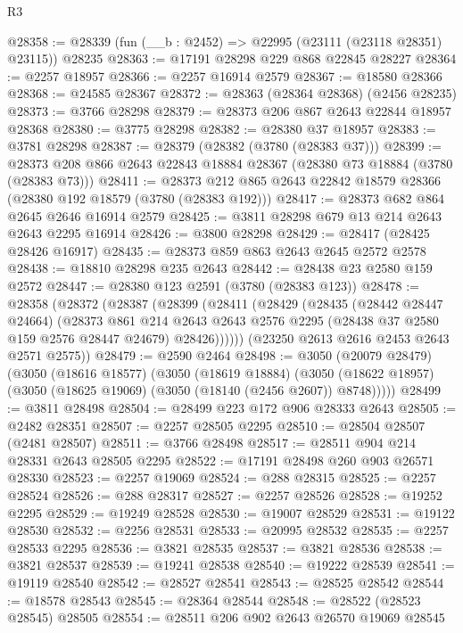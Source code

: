 \begin{lexlean}{R3}
\begin{coremodule}
@28358 := @28339 (fun (__b : @2452) => @22995 (@23111 (@23118 @28351) @23115)) @28235
@28363 := @17191 @28298 @229 @868 @22845 @28227
@28364 := @2257 @18957
@28366 := @2257 @16914 @2579
@28367 := @18580 @28366
@28368 := @24585 @28367
@28372 := @28363 (@28364 @28368) (@2456 @28235)
@28373 := @3766 @28298
@28379 := @28373 @206 @867 @2643 @22844 @18957 @28368
@28380 := @3775 @28298
@28382 := @28380 @37 @18957
@28383 := @3781 @28298
@28387 := @28379 (@28382 (@3780 (@28383 @37)))
@28399 := @28373 @208 @866 @2643 @22843 @18884 @28367 (@28380 @73 @18884 (@3780 (@28383 @73)))
@28411 := @28373 @212 @865 @2643 @22842 @18579 @28366 (@28380 @192 @18579 (@3780 (@28383 @192)))
@28417 := @28373 @682 @864 @2645 @2646 @16914 @2579
@28425 := @3811 @28298 @679 @13 @214 @2643 @2643 @2295 @16914
@28426 := @3800 @28298
@28429 := @28417 (@28425 @28426 @16917)
@28435 := @28373 @859 @863 @2643 @2645 @2572 @2578
@28438 := @18810 @28298 @235 @2643
@28442 := @28438 @23 @2580 @159 @2572
@28447 := @28380 @123 @2591 (@3780 (@28383 @123))
@28478 := @28358
    (@28372
      (@28387
        (@28399
          (@28411
            (@28429
              (@28435
                (@28442 @28447 @24664)
                (@28373
                  @861
                  @214
                  @2643
                  @2643
                  @2576
                  @2295
                  (@28438 @37 @2580 @159 @2576 @28447 @24679)
                  @28426))))))
      (@23250 @2613 @2616 @2453 @2643 @2571 @2575))
@28479 := @2590 @2464
@28498 := @3050
    (@20079 @28479)
    (@3050
      (@18616 @18577)
      (@3050
        (@18619 @18884)
        (@3050 (@18622 @18957) (@3050 (@18625 @19069) (@3050 (@18140 (@2456 @2607)) @8748)))))
@28499 := @3811 @28498
@28504 := @28499 @223 @172 @906 @28333 @2643
@28505 := @2482 @28351
@28507 := @2257 @28505 @2295
@28510 := @28504 @28507 (@2481 @28507)
@28511 := @3766 @28498
@28517 := @28511 @904 @214 @28331 @2643 @28505 @2295
@28522 := @17191 @28498 @260 @903 @26571 @28330
@28523 := @2257 @19069
@28524 := @288 @28315
@28525 := @2257 @28524
@28526 := @288 @28317
@28527 := @2257 @28526
@28528 := @19252 @2295
@28529 := @19249 @28528
@28530 := @19007 @28529
@28531 := @19122 @28530
@28532 := @2256 @28531
@28533 := @20995 @28532
@28535 := @2257 @28533 @2295
@28536 := @3821 @28535
@28537 := @3821 @28536
@28538 := @3821 @28537
@28539 := @19241 @28538
@28540 := @19222 @28539
@28541 := @19119 @28540
@28542 := @28527 @28541
@28543 := @28525 @28542
@28544 := @18578 @28543
@28545 := @28364 @28544
@28548 := @28522 (@28523 @28545) @28505
@28554 := @28511 @206 @902 @2643 @26570 @19069 @28545

\end{coremodule}
\end{lexlean}
